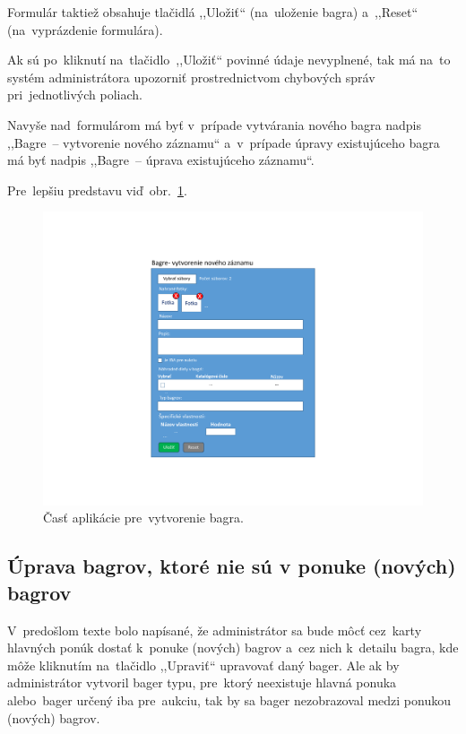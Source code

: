Formulár taktiež obsahuje tlačidlá ,,Uložiť`` (na~uloženie bagra) a~,,Reset`` (na~vyprázdenie formulára).

Ak sú po~kliknutí na~tlačidlo~,,Uložiť`` povinné údaje nevyplnené, tak má na~to systém administrátora upozorniť prostrednictvom chybových správ pri~jednotlivých poliach.

Navyše nad~formulárom má byť v~prípade vytvárania nového bagra nadpis ,,Bagre~-- vytvorenie nového záznamu`` a~v~prípade úpravy existujúceho bagra má byť nadpis ,,Bagre~-- úprava existujúceho záznamu``.

Pre~lepšiu predstavu viď~obr.~\ref{excavator form}.

\begin{figure}[H]\centering
\includegraphics[width=140mm]{../img/UI concept/excavator form}
\caption{Časť aplikácie pre~vytvorenie bagra.}
\label{excavator form}
\end{figure}

\subsection{Úprava bagrov, ktoré nie sú v ponuke (nových) bagrov}

V~predošlom texte bolo napísané, že administrátor sa bude môcť cez~karty hlavných ponúk dostať k~ponuke (nových) bagrov a~cez nich k~detailu bagra, kde môže kliknutím na~tlačidlo ,,Upraviť`` upravovať daný bager. Ale ak by administrátor vytvoril bager typu, pre~ktorý neexistuje hlavná ponuka alebo~bager určený iba pre~aukciu, tak by sa bager nezobrazoval medzi ponukou (nových) bagrov.

